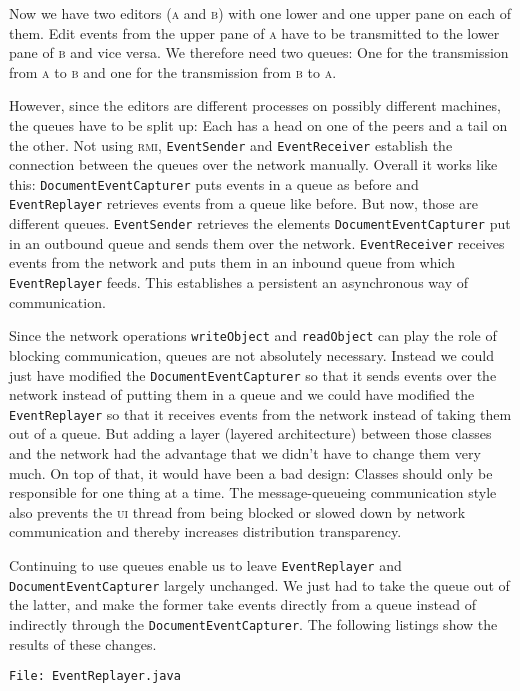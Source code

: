 \documentclass[a4paper,draft,12pt,oneside,article,table]{memoir}
\newcommand{\srcpath}{../ex09/src/main/java/ddist}
\newcommand{\inmnt}[3]{\vspace{1em}\noindent\texttt{\color{gray}File: #3}\vspace{-1em}\inputminted[tabsize=4,firstline=#1,firstnumber=#1,lastline=#2,linenos]{java}{\srcpath/#3}}
\newcommand{\mil}[1]{\texttt{#1}}
\begin{document}
Now we have two editors (\textsc{a} and \textsc{b}) with one lower and
one upper pane on each of them. Edit events from the upper pane of
\textsc{a} have to be transmitted to the lower pane of \textsc{b} and
vice versa. We therefore need two queues: One for the transmission
from \textsc{a} to \textsc{b} and one for the transmission from
\textsc{b} to \textsc{a}.

However, since the editors are different processes on possibly
different machines, the queues have to be split up: Each has a head on
one of the peers and a tail on the other.  Not using \textsc{rmi},
\mil{EventSender} and \mil{EventReceiver} establish the connection
between the queues over the network manually. Overall it works like
this: \mil{DocumentEventCapturer} puts events in a queue as before and
\mil{EventReplayer} retrieves events from a queue like before. But
now, those are different queues.  \mil{EventSender} retrieves the
elements \mil{DocumentEventCapturer} put in an outbound queue and
sends them over the network.  \mil{EventReceiver} receives events from
the network and puts them in an inbound queue from which
\mil{EventReplayer} feeds. This establishes a persistent an
asynchronous way of communication.

Since the network operations \mil{writeObject} and \mil{readObject}
can play the role of blocking communication, queues are not absolutely
necessary. Instead we could just have modified the
\mil{DocumentEventCapturer} so that it sends events over the network
instead of putting them in a queue and we could have modified the
\mil{EventReplayer} so that it receives events from the network
instead of taking them out of a queue. But adding a layer (layered
architecture) between those classes and the network had the advantage
that we didn't have to change them very much.  On top of that, it
would have been a bad design: Classes should only be responsible for
one thing at a time. The message-queueing communication style also
prevents the \textsc{ui} thread from being blocked or slowed down by
network communication and thereby increases distribution transparency.

Continuing to use queues enable us to leave \mil{EventReplayer} and
\mil{DocumentEventCapturer} largely unchanged. We just had to take the
queue out of the latter, and make the former take events directly from
a queue instead of indirectly through the
\mil{DocumentEventCapturer}. The following listings show the results
of these changes.

\inmnt{1}{1000}{EventReplayer.java}
\end{document}
